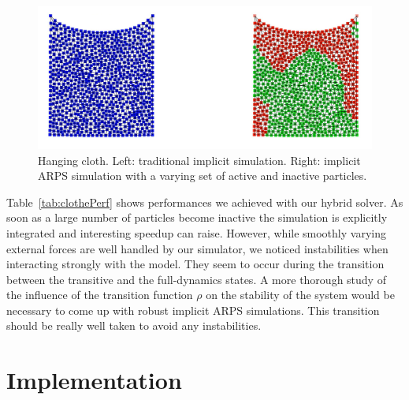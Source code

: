 \documentclass[11pt, oneside, a4paper]{memoir}
\begin{document}
\begin{figure}[htb]
  \centering
  \includegraphics[width=1.0\linewidth]{images/arps-vriphys2013/Square3.jpg}
  \caption{\label{fig:clothARPS} Hanging cloth. Left: traditional implicit simulation. Right: implicit ARPS simulation with a varying set of active and inactive particles. }
\end{figure}
Table~\ref{tab:clothePerf} shows performances we achieved with our hybrid solver.
As soon as a large number of particles become inactive the simulation is explicitly integrated and interesting speedup can raise.
\newline
However, while smoothly varying external forces are well handled by our simulator, we noticed instabilities when interacting strongly with the model.
They seem to occur during the transition between the transitive and the full-dynamics states.
A more thorough study of the influence of the transition function $\rho$ on the stability of the system would be necessary to come up with robust implicit ARPS simulations.
 This transition should be really well taken to avoid any instabilities.


\section{Implementation} \label{sec implementation}
\end{document}
